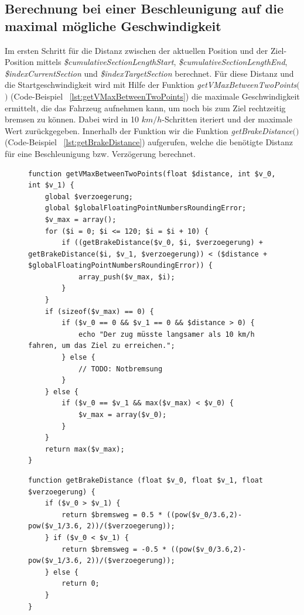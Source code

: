\subsection{Berechnung bei einer Beschleunigung auf die maximal mögliche Geschwindigkeit} \label{v_max}
Im ersten Schritt für die Distanz zwischen der aktuellen Position und der Ziel-Position mittels \textit{\$cumulativeSectionLengthStart}, \textit{\$cumulativeSectionLengthEnd}, \textit{\$indexCurrentSection} und \textit{\$indexTargetSection} berechnet. Für diese Distanz und die Startgeschwindigkeit wird mit Hilfe der Funktion \textit{getVMaxBetweenTwoPoints$($$)$} (Code-Beispiel ~\ref{lst:getVMaxBetweenTwoPoints}) die maximale Geschwindigkeit ermittelt, die das Fahrzeug aufnehmen kann, um noch bis zum Ziel rechtzeitig bremsen zu können. Dabei wird in 10 $km/h$-Schritten iteriert und der maximale Wert zurückgegeben. Innerhalb der Funktion wir die Funktion \textit{getBrakeDistance$($$)$} (Code-Beispiel ~\ref{lst:getBrakeDistance}) aufgerufen, welche die benötigte Distanz für eine Beschleunigung bzw. Verzögerung berechnet. 
\begin{figure}
\begin{lstlisting}[caption={\textit{getVMaxBetweenTwoPoints$($$)$}},captionpos=b,label={lst:getVMaxBetweenTwoPoints}]
function getVMaxBetweenTwoPoints(float $distance, int $v_0, int $v_1) {
	global $verzoegerung;
	global $globalFloatingPointNumbersRoundingError;
	$v_max = array();
	for ($i = 0; $i <= 120; $i = $i + 10) {
		if ((getBrakeDistance($v_0, $i, $verzoegerung) + getBrakeDistance($i, $v_1, $verzoegerung)) < ($distance + $globalFloatingPointNumbersRoundingError)) {
			array_push($v_max, $i);
		}
	}
	if (sizeof($v_max) == 0) {
		if ($v_0 == 0 && $v_1 == 0 && $distance > 0) {
			echo "Der zug müsste langsamer als 10 km/h fahren, um das Ziel zu erreichen.";
		} else {
			// TODO: Notbremsung
		}
	} else {
		if ($v_0 == $v_1 && max($v_max) < $v_0) {
			$v_max = array($v_0);
		}
	}
	return max($v_max);
}
\end{lstlisting}
\end{figure}
\begin{figure}
\begin{lstlisting}[caption={\textit{getBrakeDistance$($$)$}},captionpos=b,label={lst:getBrakeDistance}]
function getBrakeDistance (float $v_0, float $v_1, float $verzoegerung) {
	if ($v_0 > $v_1) {
		return $bremsweg = 0.5 * ((pow($v_0/3.6,2)-pow($v_1/3.6, 2))/($verzoegerung));
	} if ($v_0 < $v_1) {
		return $bremsweg = -0.5 * ((pow($v_0/3.6,2)-pow($v_1/3.6, 2))/($verzoegerung));
	} else {
		return 0;
	}
}
\end{lstlisting}
\end{figure}
